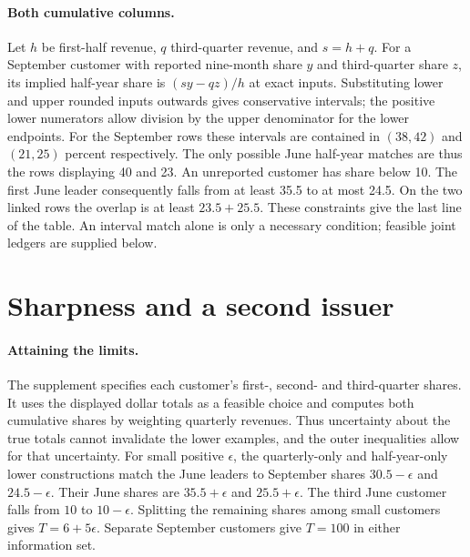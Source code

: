 \documentclass[11pt]{article}
\begin{document}
\paragraph{Both cumulative columns.} Let $h$ be first-half revenue, $q$ third-quarter revenue, and $s=h+q$. For a September customer with reported nine-month share $y$ and third-quarter share $z$, its implied half-year share is $(sy-qz)/h$ at exact inputs. Substituting lower and upper rounded inputs outwards gives conservative intervals; the positive lower numerators allow division by the upper denominator for the lower endpoints. For the September rows these intervals are contained in $(38,42)$ and $(21,25)$ percent respectively. The only possible June half-year matches are thus the rows displaying 40 and 23. An unreported customer has share below 10. The first June leader consequently falls from at least 35.5 to at most 24.5. On the two linked rows the overlap is at least $23.5+25.5$. These constraints give the last line of the table. An interval match alone is only a necessary condition; feasible joint ledgers are supplied below.

\newpage\section{Sharpness and a second issuer}
\paragraph{Attaining the limits.} The supplement specifies each customer's first-, second- and third-quarter shares. It uses the displayed dollar totals as a feasible choice and computes both cumulative shares by weighting quarterly revenues. Thus uncertainty about the true totals cannot invalidate the lower examples, and the outer inequalities allow for that uncertainty. For small positive $\epsilon$, the quarterly-only and half-year-only lower constructions match the June leaders to September shares $30.5-\epsilon$ and $24.5-\epsilon$. Their June shares are $35.5+\epsilon$ and $25.5+\epsilon$. The third June customer falls from $10$ to $10-\epsilon$. Splitting the remaining shares among small customers gives $T=6+5\epsilon$. Separate September customers give $T=100$ in either information set.
\end{document}
